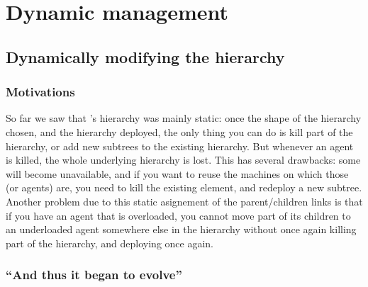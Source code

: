
\chapter{Dynamic management}
\label{ch:dynamic}

\section{Dynamically modifying the hierarchy}

\subsection{Motivations}

So far we saw that \diet's hierarchy was mainly static: once the shape
of the hierarchy chosen, and the hierarchy deployed, the only thing
you can do is kill part of the hierarchy, or add new subtrees to the
existing hierarchy. But whenever an agent is killed, the whole
underlying hierarchy is lost. This has several drawbacks: some \sed
will become unavailable, and if you want to reuse the machines on
which those \sed (or agents) are, you need to kill the existing \diet
element, and redeploy a new subtree. Another problem due to this
static asignement of the parent/children links is that if you have an
agent that is overloaded, you cannot move part of its children to an
underloaded agent somewhere else in the hierarchy without once again
killing part of the hierarchy, and deploying once again.


\subsection{``And thus it began to evolve''}

